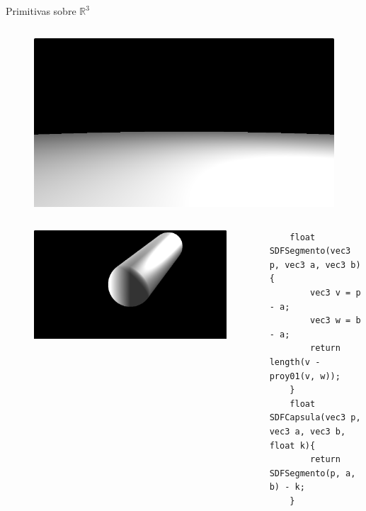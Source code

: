 \begin{frame}[fragile]{Primitivas sobre \(\mathbb{R}^3\)}
\begin{columns}[c, onlytextwidth]
        \column{1.5in}
            \begin{figure}[H]
              \centering
              \includegraphics[width=1.0\textwidth]{imagenes/sdf/3d/sdf_plano.png}
            \end{figure}
        
    \end{columns}
    
    \begin{columns}[c, onlytextwidth]
        \column{1.5in}
            \begin{figure}[H]
              \centering
              \includegraphics[width=1.0\textwidth]{imagenes/sdf/3d/sdf_capsula.png}
            \end{figure}
        
        \column{\dimexpr\paperwidth-10pt}
            \begin{lstlisting}
    float SDFSegmento(vec3 p, vec3 a, vec3 b){
        vec3 v = p - a;
        vec3 w = b - a;
        return length(v -  proy01(v, w));
    }
    float SDFCapsula(vec3 p, vec3 a, vec3 b, float k){
        return SDFSegmento(p, a, b) - k;
    }
            \end{lstlisting}
        
    \end{columns}

\end{frame}

